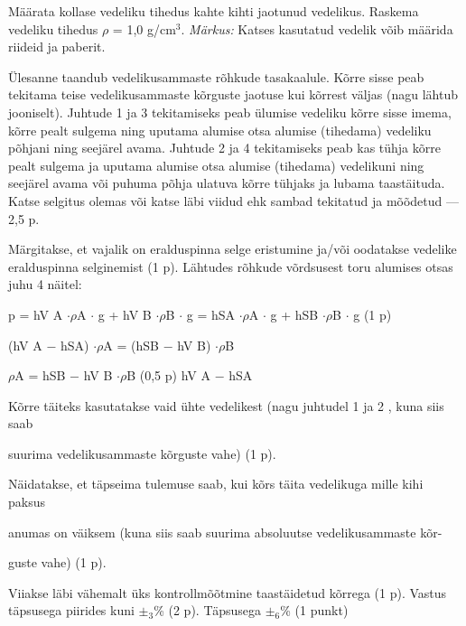 
Määrata kollase vedeliku tihedus kahte kihti jaotunud vedelikus. Raskema vedeliku tihedus $\rho$ = 1,0 g/cm$^3$.
\textit{Märkus:} Katses kasutatud vedelik võib määrida riideid ja paberit.

\hint

\solu
Ülesanne taandub vedelikusammaste rõhkude tasakaalule. Kõrre sisse peab tekitama teise vedelikusammaste kõrguste jaotuse kui kõrrest väljas (nagu lähtub jooniselt). Juhtude 1 ja 3 tekitamiseks peab ülumise vedeliku kõrre sisse imema, kõrre pealt sulgema ning uputama alumise otsa alumise (tihedama) vedeliku põhjani ning seejärel avama. Juhtude 2 ja 4 tekitamiseks peab kas tühja kõrre pealt sulgema ja uputama alumise otsa alumise (tihedama) vedelikuni ning seejärel avama või puhuma põhja ulatuva kõrre tühjaks ja lubama taastäituda. Katse selgitus olemas või katse läbi viidud ehk sambad tekitatud ja mõõdetud --- 2,5 p.

Märgitakse, et vajalik on eralduspinna selge eristumine ja/või oodatakse vedelike eralduspinna selginemist (1 p). Lähtudes rõhkude võrdsusest toru alumises otsas juhu 4 näitel:

p = hV A $\cdot \rho$A $\cdot$ g + hV B $\cdot \rho$B $\cdot$ g = hSA $\cdot \rho$A $\cdot$ g + hSB $\cdot \rho$B $\cdot$ g (1 p)

(hV A $-$ hSA) $\cdot \rho$A = (hSB $-$ hV B) $\cdot \rho$B

$\rho$A = hSB $-$ hV B $\cdot \rho$B (0,5 p) hV A $-$ hSA

Kõrre täiteks kasutatakse vaid ühte vedelikest (nagu juhtudel 1 ja 2 , kuna siis saab

suurima vedelikusammaste kõrguste vahe) (1 p).

Näidatakse, et täpseima tulemuse saab, kui kõrs täita vedelikuga mille kihi paksus

anumas on väiksem (kuna siis saab suurima absoluutse vedelikusammaste kõr-

guste vahe) (1 p).

Viiakse läbi vähemalt üks kontrollmõõtmine taastäidetud kõrrega (1 p). Vastus täpsusega piirides kuni $\pm_3$\% (2 p). Täpsusega $\pm_6$\% (1 punkt)

